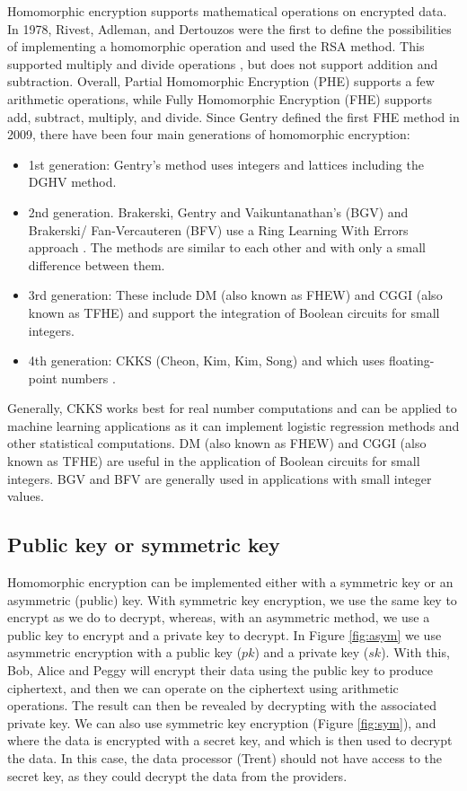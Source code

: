 \documentclass[envcountsame,runningheads,notitlepage]{llncs}
\begin{document}
Homomorphic encryption supports mathematical operations on encrypted data. In 1978, Rivest, Adleman, and Dertouzos \cite{rivest1978data} were the first to define the possibilities of implementing a homomorphic operation and used the RSA method. This supported multiply and divide operations \cite{asecuritysite_17070}, but does not support addition and subtraction. Overall, Partial Homomorphic Encryption (PHE) supports a few arithmetic operations, while Fully Homomorphic Encryption (FHE) supports add, subtract, multiply, and divide.  Since Gentry defined the first FHE method \cite{homenc} in 2009, there have been four main generations of homomorphic encryption:

\begin{itemize}
    \item 1st generation: Gentry’s method uses integers and lattices \cite{van2010fully} including the DGHV method.
    \item 2nd generation. Brakerski, Gentry and Vaikuntanathan’s (BGV) and Brakerski/ Fan-Vercauteren (BFV) use a Ring Learning With Errors approach \cite{brakerski2014efficient}.  The methods are similar to each other and with only a small difference between them.
    \item 3rd generation: These include DM (also known as FHEW) and CGGI (also known as TFHE) and support the integration of  Boolean circuits for small integers. 
    \item 4th generation: CKKS (Cheon, Kim, Kim, Song) and which uses floating-point numbers \cite{cheon2017homomorphic}.
\end{itemize}

Generally, CKKS works best for real number computations and can be applied to machine learning applications as it can implement logistic regression methods and other statistical computations. DM (also known as FHEW) and CGGI (also known as TFHE) are useful in the application of Boolean circuits for small integers. BGV and BFV are generally used in applications with small integer values.



\subsection{Public key or symmetric key}
Homomorphic encryption can be implemented either with a symmetric key or an asymmetric (public) key. With symmetric key encryption, we use the same key to encrypt as we do to decrypt, whereas, with an asymmetric method, we use a public key to encrypt and a private key to decrypt.  In Figure \ref{fig:asym} we use asymmetric encryption with a public key ($pk$) and a private key ($sk$). With this, Bob, Alice and Peggy will encrypt their data using the public key to produce ciphertext, and then we can operate on the ciphertext using arithmetic operations. The result can then be revealed by decrypting with the associated private key. We can also use symmetric key encryption (Figure \ref{fig:sym}), and where the data is encrypted with a secret key, and which is then used to decrypt the data. In this case, the data processor (Trent) should not have access to the secret key, as they could decrypt the data from the providers.
\end{document}
